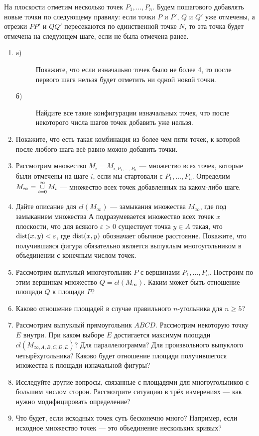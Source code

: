  На плоскости отметим несколько точек $P_1,\dots, P_n$. Будем пошагового добавлять новые точки по следующему правилу:
если точки $P$ и $P'$, $Q$ и $Q'$ уже отмечены, а отрезки $PP'$ и $QQ'$ пересекаются по единственной точке $N$, то эта точка будет отмечена на следующем шаге, если не была отмечена ранее.
\begin{enumerate}
\item
\begin{description}
\item[а)] Покажите, что если изначально точек было не более 4, то после первого шага нельзя будет отметить ни одной новой точки.
\item[б)] Найдите все такие конфигурации изначальных точек, что после некоторого числа шагов точек добавить уже нельзя.
\end{description}

\item Покажите, что есть такая комбинация из более чем пяти точек, к которой после любого шага всё равно можно добавить точки.
\item Рассмотрим множество $M_i=M_{i, P_1,\dots, P_n}$ --- множество всех точек, которые были отмечены на шаге $i$, если мы стартовали с $P_1,\dots, P_n$. Определим $M_{\infty}=\mathop{\cup}\limits_{i=0}^{\infty} M_i$ --- множество всех точек добавленных на каком-либо шаге.
\item Дайте описание для $cl(M_{\infty})$ --- замыкания множества $M_{\infty}$, где под замыканием множества А подразумевается множество всех точек $x$ плоскости, что для всякого $\varepsilon>0$ существует точка $y\in A$ такая, что $\operatorname{dist}(x, y)<\varepsilon$, где $\operatorname{dist}(x,y)$ обозначает обычное расстояние. Покажите, что получившаяся фигура обязательно является выпуклым многоугольником в объединении с конечным числом точек.
\item Рассмотрим выпуклый многоугольник $P$ с вершинами $P_1,\dots, P_n$. Построим по этим вершинам множество $Q=cl(M_{\infty})$. Каким может быть отношение площади $Q$ к площади $P$?
\item Каково отношение площадей в случае правильного $n$-угольника для $n\geq 5$?
\item Рассмотрим выпуклый прямоугольник $ABCD$. Рассмотрим некоторую точку $E$ внутри. При каком выборе $E$ достигается максимум площади $cl(M_{\infty,A,B,C,D,E})$? Для параллелограмма? Для произвольного выпуклого четырёхугольника? Каково будет отношение площади получившегося множества к площади изначальной фигуры?
\item Исследуйте другие вопросы, связанные с площадями для многоугольников с большим числом сторон. Рассмотрите ситуацию в трёх измерениях --- как нужно модифицировать определение?
\item Что будет, если исходных точек суть бесконечно много? Например, если исходное множество точек --- это объединение нескольких кривых?

\end{enumerate}



